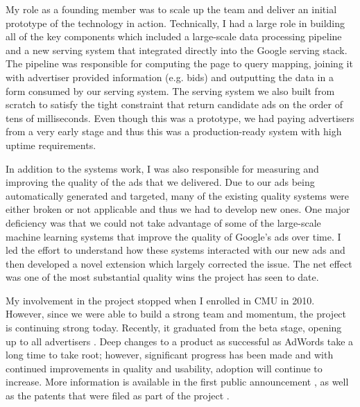 \documentclass[12pt]{article}
\begin{document}
My role as a founding member was to scale up the team and deliver an initial prototype of the technology in action. Technically, I had a large role in building all of the key components which included a large-scale data processing pipeline and a new serving system that integrated directly into the Google serving stack. The pipeline was responsible for computing the page to query mapping, joining it with advertiser provided information (e.g. bids) and outputting the data in a form consumed by our serving system. The serving system we also built from scratch to satisfy the tight constraint that return candidate ads on the order of tens of milliseconds. Even though this was a prototype, we had paying advertisers from a very early stage and thus this was a production-ready system with high uptime requirements.

In addition to the systems work, I was also responsible for measuring and improving the quality of the ads that we delivered. Due to our ads being automatically generated and targeted, many of the existing quality systems were either broken or not applicable and thus we had to develop new ones. One major deficiency was that we could not take advantage of some of the large-scale machine learning systems that improve the quality of Google's ads over time. I led the effort to understand how these systems interacted with our new ads and then developed a novel extension which largely corrected the issue. The net effect was one of the most substantial quality wins the project has seen to date.

My involvement in the project stopped when I enrolled in CMU in 2010. However, since we were able to build a strong team and momentum, the project is continuing strong today. Recently, it graduated from the beta stage, opening up to all advertisers \cite{jain}. Deep changes to a product as successful as AdWords take a long time to take root; however, significant progress has been made and with continued improvements in quality and usability, adoption will continue to increase. More information is available in the first public announcement \cite{gultekin}, as well as the patents that were filed as part of the project \cite{brunsman,brunsman2,brunsman3}.

\renewcommand{\refname}{\vskip -1.5cm}
\footnotesize


\end{document}
